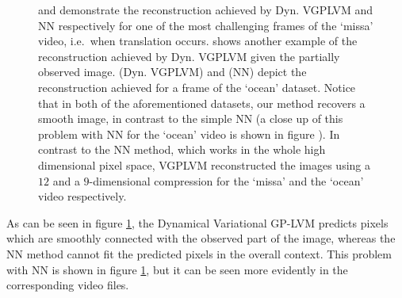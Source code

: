 \documentclass [10pt , a4paper]{article}
\begin{document}
\begin{figure}[ht]
\begin{center}
{	\label{fig:ocean3}
}
      

\end{center}
\caption{\small{
     and  demonstrate the reconstruction achieved by Dyn. VGPLVM and NN respectively for one of the most challenging frames  of the `missa' video, i.e.\ when translation occurs.  shows another example of the reconstruction achieved by Dyn. VGPLVM given the partially observed image.  (Dyn. VGPLVM) and  (NN) depict the reconstruction achieved for a frame of the `ocean' dataset. %
Notice that in both of the aforementioned datasets, our method recovers a smooth image, in contrast to the simple NN (a close up of this problem with NN for the `ocean' video is shown in figure ). In contrast to the NN method, which works in the whole high dimensional pixel space, VGPLVM reconstructed the images using a $12$ and a $9$-dimensional compression for the `missa' and the `ocean' video respectively.
}
}
\label{fig:video1}
\end{figure}
As can be seen in figure \ref{fig:video1}, the Dynamical Variational GP-LVM predicts pixels which
are smoothly connected with the observed part of the image, whereas the NN method cannot fit the predicted pixels in the overall context.
This problem with NN is shown in figure \ref{fig:video1}, but it can be seen more evidently in the corresponding video files.
\end{document}
